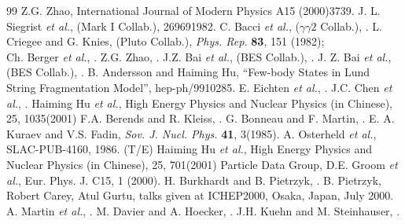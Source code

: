 \begin{thebibliography}{99}
 Z.G. Zhao, International Journal of Modern Physics A15
(2000)3739.
 J. L. Siegrist {\it et al.}, (Mark I Collab.), \Journal
{\PRD}{26}{969}{1982}.         
 C. Bacci {\it et al.}, ($\gamma \gamma2$ Collab.),
.
 L. Criegee and G. Knies, (Pluto Collab.),
{\em Phys. Rep.} {\bf 83}, 151 (1982);\\
Ch. Berger {\it et al.}, .
 Z.G. Zhao, . 
J.Z. Bai {\it et al.}, (BES Collab.),
.
 J. Z. Bai {\it et al.}, (BES Collab.),
.
 B. Andersson and Haiming Hu, ``Few-body States in Lund String
Fragmentation Model'', hep-ph/9910285.
E. Eichten {\it et al.}, .
J.C. Chen {\it et al.}, .
 Haiming Hu {\it et al.}, High Energy Physics and Nuclear
Physics (in Chinese), 25, 1035(2001)
F.A. Berends and R. Kleiss, .
G. Bonneau and F. Martin, .
E. A. Kuraev and V.S. Fadin, {\em Sov. J. Nucl.
Phys.} {\bf41}, 3(1985). 
A. Osterheld {\it et al.}, SLAC-PUB-4160, 1986. (T/E)
Haiming Hu {\it et al.}, High Energy Physics and Nuclear Physics
(in Chinese), 25, 701(2001)
 Particle Data Group, D.E. Groom {\it et al.}, Eur. Phys. J.
C15, 1 (2000).
 H. Burkhardt and B. Pietrzyk,
.
 B. Pietrzyk, Robert Carey, Atul Gurtu, 
talks given at ICHEP2000, Osaka, Japan, July 2000.
 A. Martin {\it et al.}, . 
 M. Davier and A. Hoecker, .
 J.H. Kuehn and M. Steinhauser, .

\end{thebibliography}



